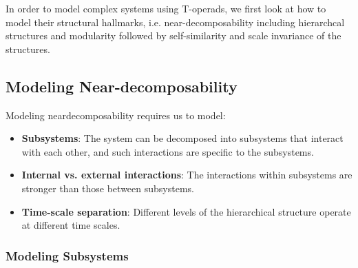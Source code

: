 In order to model complex systems using T-operads, we first look at how to model their structural hallmarks, i.e. near-decomposability including hierarchcal structures and modularity followed by self-similarity and scale invariance of the structures.

\subsection{Modeling Near-decomposability}

Modeling neardecomposability requires us to model:

\begin{itemize}
    \item \textbf{Subsystems}: The system can be decomposed into subsystems that interact with each other, and such interactions are specific to the subsystems.
    \item \textbf{Internal vs. external interactions}: The interactions within subsystems are stronger than those between subsystems.
    \item \textbf{Time-scale separation}: Different levels of the hierarchical structure operate at different time scales.
\end{itemize}

\subsubsection{Modeling Subsystems}

